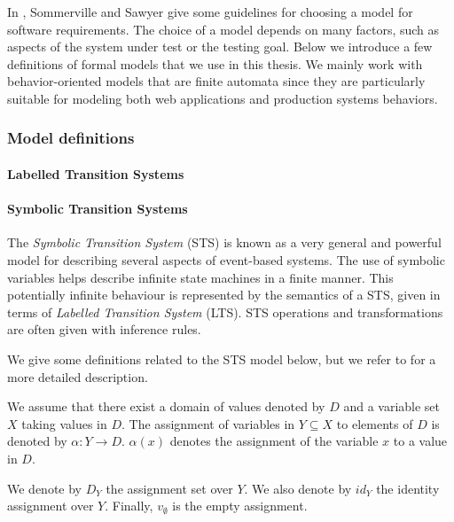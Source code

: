 In \cite{Sommerville:1997:REG:549198}, Sommerville and Sawyer
give some guidelines for choosing a model for software
requirements. The choice of a model depends on many factors, such
as aspects of the system under test or the testing goal.  Below
we introduce a few definitions of formal models that we use in
this thesis. We mainly work with behavior-oriented models that
are finite automata since they are particularly suitable for
modeling both web applications and production systems behaviors.

\subsubsection{Model definitions}

\paragraph{Labelled Transition Systems}
\label{sec:definitions:lts}


\paragraph{Symbolic Transition Systems}
\label{sec:definitions:sts}

The \textit{Symbolic Transition System} (STS) is known as a very
general and powerful model for describing several aspects of
event-based systems. The use of symbolic variables
helps describe infinite state machines in a finite manner. This
potentially infinite behaviour is represented by the semantics of
a STS, given in terms of \textit{Labelled Transition System}
(LTS). STS operations and transformations are often given with
inference rules.

We give some definitions related to the STS model below, but we
refer to \cite{FTW05} for a more detailed description.

\begin{definition}
We assume that there exist a domain of values denoted by $D$ and
a variable set $X$ taking values in $D$. The assignment of
variables in $Y \subseteq X$ to elements of $D$ is denoted by
$\alpha: Y \rightarrow D$. $\alpha(x)$ denotes the assignment of
the variable $x$ to a value in $D$.

We denote by $D_Y$ the assignment set over $Y$. We also denote by
$id_Y$ the identity assignment over $Y$. Finally, $v_\emptyset$
is the empty assignment.
\end{definition}

